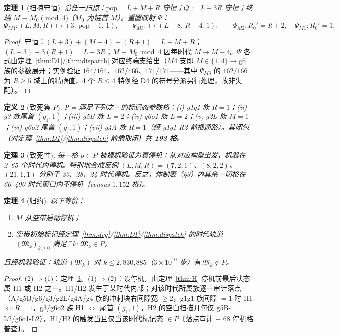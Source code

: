 \documentclass[11pt]{ctexart}
\newtheorem{theorem}{定理}[section]
\newtheorem{definition}[theorem]{定义}
\begin{document}
\begin{theorem}[扫掠守恒]\label{thm:sweep}
沿任一扫掠：$\mathrm{pop}=L{+}M{+}R$ 守恒；$Q:=L-3R$ 守恒；终端 $M\equiv M_0\pmod 4$（$M_0$ 为链首 $M$）。重置映射 $\Psi$：
\[
\Psi_{M4}\colon(L,M,R)\mapsto(3,\,\mathrm{pop}-1,\,1),\qquad
\Psi_{M3}\colon\mapsto(L{+}8,\,R{-}4,\,1),\qquad
\Psi_{M2}\colon R_0'=R+2,\quad \Psi_{M1}\colon R_0'=1 .
\]
\end{theorem}
\begin{proof}
守恒：$(L{+}3)+(M{-}4)+(R{+}1)=L{+}M{+}R$；$(L{+}3)-3(R{+}1)=L-3R$；$M\equiv M_0 \bmod 4$ 因每时代 $M\mapsto M-4$。$\Psi$ 各式由定理~\ref{thm:D1}/\ref{thm:dispatch} 对应终端支给出（$M4$ 支即 $M\in\{1,4\}\to$g6 族的参数展开；实例验证 $164/164$、$162/166$、$171/171$——其中 $\Psi_{M3}$ 的 $162/166$ 为 $R\ge5$ 域上的精确值，4 个 $R\le4$ 特例经 D4 的符号分派另行处理，故非失配）。
\end{proof}

\begin{definition}[致死集 $P$]
$P$ = 满足下列之一的标记态参数格：(i) g1g1 族 $R=1$；(ii) g3 族尾首 $(g_1,1)$；(iii) g5B 族 $L=2$；(iv) g6o1 族 $L=2$；(v) g2L 族 $M=1$；(vi) g6o2 尾首 $(g_1,1)$；(vii) g4A 族 $R=1$（经 g1g1-R2 前插通路）。其闭包（对定理~\ref{thm:D1}/\ref{thm:dispatch} 前像取闭）共 \textbf{193 格}。
\end{definition}

\begin{theorem}[致死性]\label{thm:lethal}
每一格 $p\in P$ 被裸机验证为真停机：从对应构型出发，机器在 2--65 个时代内停机。特别地合成反例 $(L,M,R)=(7,2,1)$、$(8,2,2)$、$(21,1,1)$ 分别于 33、28、24 时代停机。反之，体制表（\S3）内其余一切格在 60--400 时代窗口内不停机〔census $1{,}152$ 格〕。
\end{theorem}

\begin{theorem}[归约]\label{thm:reduction}
以下等价：
\begin{enumerate}
\item $M$ 从空带启动停机；
\item 空带初始标记经定理~\ref{thm:dry}/\ref{thm:D1}/\ref{thm:dispatch} 的时代轨道 $(\mathfrak M_k)_{k\ge0}$ 满足 $\exists k:\ \mathfrak M_k\in P$。
\end{enumerate}
且经机器验证：轨道 $(\mathfrak M_k)$ 对 $k\le 2{,}830{,}885$（$3\times10^{10}$ 步）有 $\mathfrak M_k\notin P$。
\end{theorem}
\begin{proof}
(2)$\Rightarrow$(1)：定理~\ref{thm:lethal}。(1)$\Rightarrow$(2)：设停机，由定理~\ref{thm:H} 停机前最后状态属 H1 或 H2 之一。H1/H2 发生于某时代内部；对该时代所属族逐一审计落点（A/g5B/g6/g3/g2L/g4A/g4 族的冲刺块右间隙宽 $\ge2$，g1g1 族间隙 $=1$ 时 H1 $\iff R=1$，g3/g6o2 族 H1 $\iff$ 尾首 $(g_1,1)$，H2 的空白扫描几何仅 g5B-L2/g6o1-L2），H1/H2 的触发当且仅当该时代标记态 $\in P$〔落点审计 + 68 停机格普查〕。
\end{proof}
\end{document}
